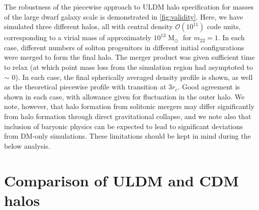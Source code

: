 \documentclass[a4paper,11pt]{article}
\begin{document}
The robustness of the piecewise approach to ULDM halo specification for masses of the large dwarf galaxy scale is demonstrated in \ref{fig:validity}.
Here, we have simulated three different halos, all with central density $\mathcal{O}(10^{11})$ code units, corresponding to a virial mass of approximately $10^{13}\operatorname{M}_{\odot}$ for $m_{22} = 1$. In each case, different numbers of soliton progenitors in different initial configurations were merged to form the final halo. The merger product was given sufficient time to relax (at which point mass loss from the simulation region had asymptoted to $\sim$ 0). In each case, the final spherically averaged density profile is shown, as well as the theoretical piecewise profile with transition at $3 r_c$. Good agreement is shown in each case, with allowance given for fluctuation in the outer halo. We note, however, that halo formation from solitonic mergers may differ significantly from halo formation through direct gravitational collapse, and we note also that inclusion of baryonic physics can be expected to lead to significant deviations from DM-only simulations. These limitations should be kept in mind during the below analysis.
 


\section{Comparison of ULDM and CDM halos}\label{sec:ULDM_v_CDM}
\end{document}
